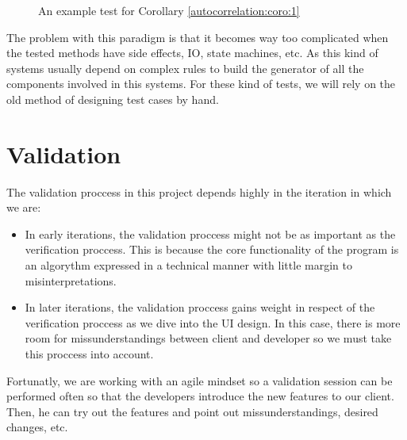     \begin{figure}[ht!]
      \caption{An example test for Corollary \ref{autocorrelation:coro:1}}
      \label{test_example}
    \end{figure}

    The problem with this paradigm is that it becomes way too complicated when
    the tested methods have side effects, IO, state machines, etc. As this
    kind of systems usually depend on complex rules to build the generator of
    all the components involved in this systems. For these kind of tests, we
    will rely on the old method of designing test cases by hand.\\

\section{Validation}

The validation proccess in this project depends highly in the iteration in which
we are:

\begin{itemize}
  \item In early iterations, the validation proccess might not be as important
  as the verification proccess. This is because the core functionality of the
  program is an algorythm expressed in a technical manner with little margin
  to misinterpretations.
  \item In later iterations, the validation proccess gains weight in respect of
  the verification proccess as we dive into the UI design. In this case, there
  is more room for missunderstandings between client and developer so we must
  take this proccess into account.
\end{itemize}

Fortunatly, we are working with an agile mindset so a validation
session can be performed often so that the developers introduce the new features to
our client. Then, he can try out the features and point out missunderstandings,
desired changes, etc.\\

